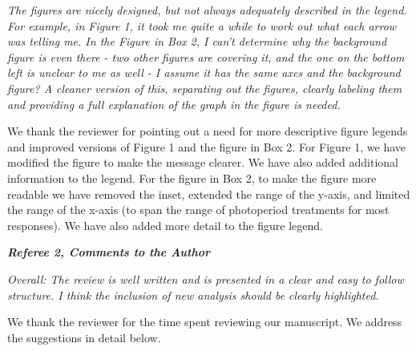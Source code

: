 \documentclass{article}
\begin{document}
\par \emph{The figures are nicely designed, but not always adequately described in the legend. For example, in Figure 1, it took me quite a while to work out what each arrow was telling me. In the Figure in Box 2, I can't determine why the background figure is even there - two other figures are covering it, and the one on the bottom left is unclear to me as well - I assume it has the same axes and the background figure? A cleaner version of this, separating out the figures, clearly labeling them and providing a full explanation of the graph in the figure is needed.}

\par We thank the reviewer for pointing out a need for more descriptive figure legends and improved versions of Figure 1 and the figure in Box 2.
For Figure 1, we have modified the figure to make the message clearer. We have also added additional information to the legend.
For the figure in Box 2,  to make the figure more readable we have removed the inset, extended the range of the y-axis, and limited the range of the x-axis (to span the range of photoperiod treatments for most responses). We have also added more detail to the figure legend.


\emph{{\bf Referee 2, Comments to the Author}}
\par \emph{Overall: The review is well written and is presented in a clear and easy to follow structure. I think the inclusion of new analysis should be clearly highlighted.}

\par We thank the reviewer for the time spent reviewing our manuscript. We address the suggestions in detail below. 
\end{document}
